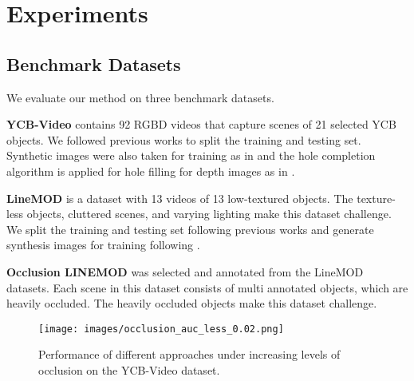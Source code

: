 \section{Experiments}
\subsection{Benchmark Datasets}
We evaluate our method on three benchmark datasets. 

\textbf{YCB-Video} \cite{calli2015ycb} contains 92 RGBD videos that capture scenes of 21 selected YCB objects. We followed previous works \cite{xiang2017posecnn,wang2019densefusion,he2020pvn3d} to split the training and testing set. Synthetic images were also taken for training as in \cite{xiang2017posecnn} and the hole completion algorithm \cite{ku2018defense} is applied for hole filling for depth images as in \cite{he2020pvn3d}. 

\textbf{LineMOD} \cite{hinterstoisser2011multimodal} is a dataset with 13 videos of 13 low-textured objects. The texture-less objects, cluttered scenes, and varying lighting make this dataset challenge. We split the training and testing set following previous works \cite{xiang2017posecnn,peng2019pvnet} and generate synthesis images for training following \cite{peng2019pvnet,he2020pvn3d}.

\textbf{Occlusion LINEMOD} \cite{OcclusionLMbrachmann2014learning} was selected and annotated from the LineMOD datasets. Each scene in this dataset consists of multi annotated objects, which are heavily occluded. The heavily occluded objects make this dataset challenge.


\begin{figure}
  \centering
  \texttt{[image: images/occlusion\_auc\_less\_0.02.png]}
  \caption{
    Performance of different approaches under increasing levels of occlusion on the YCB-Video dataset.
  }
  \label{fig:occlussion_auc}
\end{figure}

